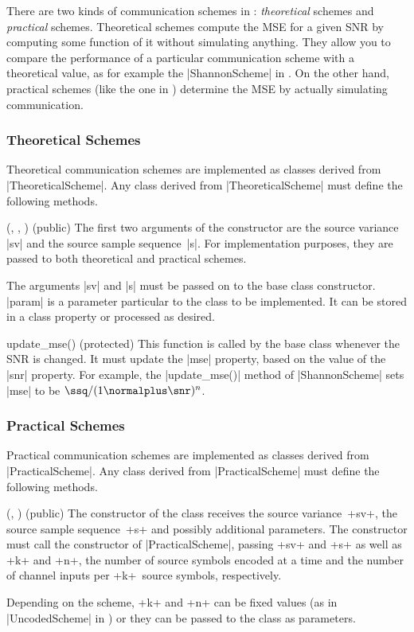 There are two kinds of communication schemes in \jscsim: \emph{theoretical}
schemes and \emph{practical} schemes. Theoretical schemes compute the MSE for a
given SNR by computing some function of it without simulating anything. They
allow you to compare the performance of a particular communication scheme with a
theoretical value, as for example the |ShannonScheme| in .
On the other hand, practical schemes (like the one in )
determine the MSE by actually simulating communication.


\subsubsection{Theoretical Schemes}

Theoretical communication schemes are implemented as classes derived from
|TheoreticalScheme|. Any class derived from |TheoreticalScheme| must define the
following methods.

\begin{method}{(, , ) (public)}
  The first two arguments of the constructor are the source variance |sv| and
  the source sample sequence~|s|.  For implementation purposes, they are passed
  to both theoretical and practical schemes.  

  The arguments |sv| and |s| must be passed on to the base class constructor.
  |param| is a parameter particular to the class to be implemented. It can be
  stored in a class property or processed as desired.
\end{method}

\begin{method}{update_mse(\obj) (protected)}
    This function is called by the base class whenever the SNR is changed. It
    must update the |mse| property, based on the value of the |snr| property.
    For example, the |update_mse()| method of |ShannonScheme| sets |mse| to be
    $\ssq / (1 \normalplus \snr)^n$.
\end{method}



\subsubsection{Practical Schemes}

Practical communication schemes are implemented as classes derived from
|PracticalScheme|. Any class derived from |PracticalScheme| must define the
following methods.
\begin{method}{(, 
  ) (public)}
  The constructor of the class receives the source variance~+sv+, the source
  sample sequence~+s+ and possibly additional parameters. The constructor must
  call the constructor of |PracticalScheme|, passing +sv+ and +s+ as well as +k+
  and +n+, the number of source symbols encoded at a time and the number of
  channel inputs per +k+~source symbols, respectively. 

  Depending on the scheme, +k+ and +n+ can be fixed values (as in
  |UncodedScheme| in ) or they can be passed to the class as
  parameters.
\end{method}

